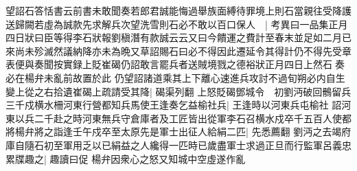 望詔石答恬書云前書未敢聞奏若郎君誠能悔過舉族面縛待罪境上則石當親往受降護送歸闕若虛為誠款先求解兵次望洗雪則石必不敢以百口保人　|{
	考異曰一品集正月四日狀曰臣等得李石狀報劉稹潛有款誠云云又曰今饋運之費計至春末並足如二月已來尚未殄滅然議納降亦未為晩又草詔賜石曰必不得因此遷延令其得計仍不得先受章表便與奏聞按實録上貶崔碣仍詔敢言罷兵者送賊境戮之德裕狀正月四日上然石奏必在楊弁未亂前故置於此}
仍望詔諸道乘其上下離心速進兵攻討不過旬朔必内自生變上從之右拾遺崔碣上疏請受其降|{
	碣渠列翻}
上怒貶碣鄧城令　初劉沔破回鶻留兵三千戍横水柵河東行營都知兵馬使王逢奏乞益榆社兵|{
	王逢時以河東兵屯榆社}
詔河東以兵二千赴之時河東無兵守倉庫者及工匠皆出從軍李石召横水戍卒千五百人使都將楊弁將之詣逢壬午戍卒至太原先是軍士出征人給絹二匹|{
	先悉薦翻}
劉沔之去竭府庫自隨石初至軍用乏以已絹益之人纔得一匹時已歲盡軍士求過正旦而行監軍呂義忠累牒趣之|{
	趣讀曰促}
楊弁因衆心之怒又知城中空虛遂作亂

